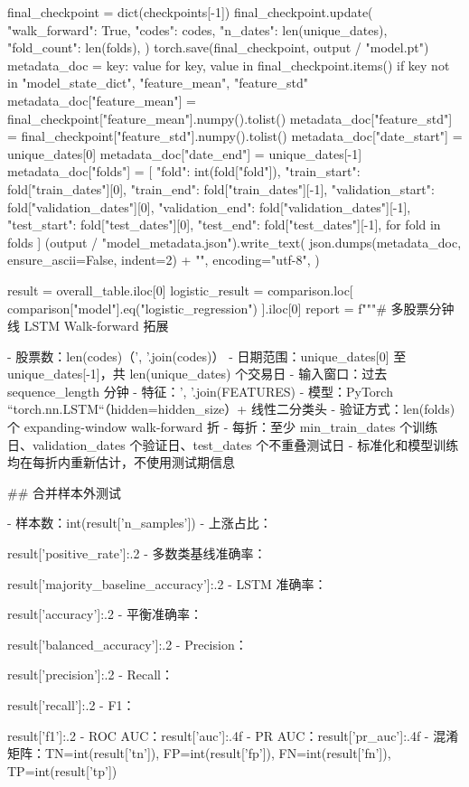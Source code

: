 \documentclass[UTF8,a4paper,fontset=fandol]{ctexart}
\begin{document}
\begin{ProjectCode}
{{    final_checkpoint = dict(checkpoints[-1])
    final_checkpoint.update({
        "walk_forward": True,
        "codes": codes,
        "n_dates": len(unique_dates),
        "fold_count": len(folds),
    })
    torch.save(final_checkpoint, output / "model.pt")
    metadata_doc = {
        key: value
        for key, value in final_checkpoint.items()
        if key not in {"model_state_dict", "feature_mean", "feature_std"}
    }
    metadata_doc["feature_mean"] = final_checkpoint["feature_mean"].numpy().tolist()
    metadata_doc["feature_std"] = final_checkpoint["feature_std"].numpy().tolist()
    metadata_doc["date_start"] = unique_dates[0]
    metadata_doc["date_end"] = unique_dates[-1]
    metadata_doc["folds"] = [
        {
            "fold": int(fold["fold"]),
            "train_start": fold["train_dates"][0],
            "train_end": fold["train_dates"][-1],
            "validation_start": fold["validation_dates"][0],
            "validation_end": fold["validation_dates"][-1],
            "test_start": fold["test_dates"][0],
            "test_end": fold["test_dates"][-1],
        }
        for fold in folds
    ]
    (output / "model_metadata.json").write_text(
        json.dumps(metadata_doc, ensure_ascii=False, indent=2) + "\n",
        encoding="utf-8",
    )

    result = overall_table.iloc[0]
    logistic_result = comparison.loc[
        comparison["model"].eq("logistic_regression")
    ].iloc[0]
    report = f"""# 多股票分钟线 LSTM Walk-forward 拓展

- 股票数：{len(codes)}（{', '.join(codes)}）
- 日期范围：{unique_dates[0]} 至 {unique_dates[-1]}，共 {len(unique_dates)} 个交易日
- 输入窗口：过去 {sequence_length} 分钟
- 特征：{', '.join(FEATURES)}
- 模型：PyTorch ``torch.nn.LSTM``（hidden={hidden_size}）+ 线性二分类头
- 验证方式：{len(folds)} 个 expanding-window walk-forward 折
- 每折：至少 {min_train_dates} 个训练日、{validation_dates} 个验证日、{test_dates} 个不重叠测试日
- 标准化和模型训练均在每折内重新估计，不使用测试期信息

## 合并样本外测试

- 样本数：{int(result['n_samples'])}
- 上涨占比：{result['positive_rate']:.2%
- 多数类基线准确率：{result['majority_baseline_accuracy']:.2%
- LSTM 准确率：{result['accuracy']:.2%
- 平衡准确率：{result['balanced_accuracy']:.2%
- Precision：{result['precision']:.2%
- Recall：{result['recall']:.2%
- F1：{result['f1']:.2%
- ROC AUC：{result['auc']:.4f}
- PR AUC：{result['pr_auc']:.4f}
- 混淆矩阵：TN={int(result['tn'])}, FP={int(result['fp'])}, FN={int(result['fn'])}, TP={int(result['tp'])}

}}}}}}}}}
\end{ProjectCode}
\end{document}
